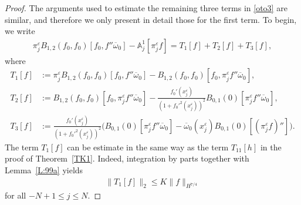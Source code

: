 \documentclass[11pt,reqno]{amsart}
\numberwithin{equation}{section}
\newcommand{\0}{\Omega}
\newcommand{\e}{\varepsilon}
\newcommand{\ov}{\overline}
\newcommand{\oo}{\ov\omega}
\newcommand{\bA}{\mathbb{A}}
\numberwithin{equation}{section}
\begin{document}
\begin{proof}
The arguments used to estimate the remaining three terms in \eqref{oto3}  are similar, and therefore we only present in detail those for the first term.
To begin, we write
 \begin{align*}
  \pi_j^\e B_{1,2}( f_0, f_0)[f_0,f''\oo_0]-\bA_{j}^1[\pi_j^\e f]=T_{1}[f]+T_{2}[f]+T_{3}[f],
 \end{align*}
where
\begin{align*}
 T_{1}[f]&:= \pi_j^\e B_{1,2}( f_0, f_0)[ f_0,f''\oo_0]-  B_{1,2}(f_0, f_0)[ f_0,\pi_j^\e f''\oo_0],\\[1ex]
 T_{2}[f]&:=    B_{1,2}( f_0, f_0)[f_0,\pi_j^\e f''\oo_0]- \frac{f_0'(x_j^\e)}{(1+f_0'^2(x_j^\e))^2}B_{0,1}(0)[\pi_j^\e f''\oo_0],\\[1ex]
 T_{3}[f]&:=      \frac{ f_0'(x_j^\e)}{(1+f_0'^2(x_j^\e))^2}\big(B_{0,1}(0)[\pi_j^\e f''\oo_0]-\oo_0(x_j^\e)B_{0,1}(0)[(\pi_j^\e f)'']\big).
\end{align*}
The term $T_{1}[f] $ can be estimate in the same way as  the term $T_{11}[h]$  in the proof of Theorem~\ref{TK1}. Indeed, integration by parts  together with Lemma~\ref{L:99a} yields
\begin{align}\label{ca11}
 \|T_{1}[f]\|_2\leq K\|f\|_{H^{7/4}} 
\end{align}
 for all $-N+1\leq j\leq N$.
 

\end{proof}
\end{document}
